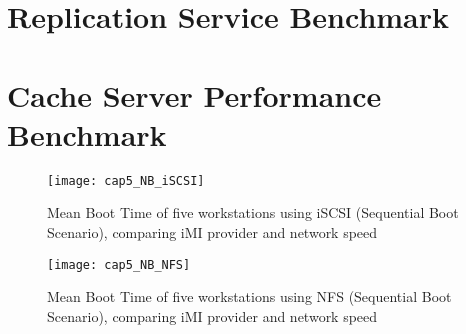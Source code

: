 \section{Replication Service Benchmark}
\label{sec:eval_rep_bench}








\section{Cache Server Performance Benchmark}
\label{sub:eval_cache_bench}

\begin{figure}[htbp]
	\centering
	\texttt{[image: cap5\_NB\_iSCSI]}
	\caption{Mean Boot Time of five workstations using iSCSI (Sequential Boot Scenario), comparing iMI provider and network speed}
	\label{fig:boot_iscsi}
\end{figure}

\begin{figure}[htbp]
	\centering
	\texttt{[image: cap5\_NB\_NFS]}
	\caption{Mean Boot Time of five workstations using NFS (Sequential Boot Scenario), comparing iMI provider and network speed}
	\label{fig:boot_nfs}
\end{figure}


